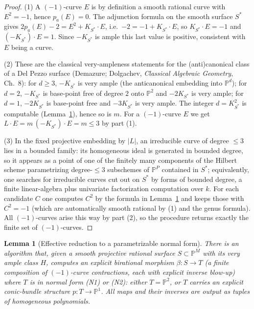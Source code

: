 \documentclass{amsart}
\theoremstyle{plain}
\newtheorem{lemma}{Lemma}
\theoremstyle{definition}
\newcommand{\PP}{\mathbb{P}}
\begin{document}
\begin{proof}
(1) A $(-1)$-curve $E$ is by definition a smooth rational curve with $E^2=-1$,
hence $p_a(E)=0$.  The adjunction formula on the smooth surface $S^\ast$ gives
$2p_a(E)-2=E^2+K_{S^\ast}\cdot E$, i.e.\ $-2=-1+K_{S^\ast}\cdot E$, so
$K_{S^\ast}\cdot E=-1$ and $(-K_{S^\ast})\cdot E=1$.  Since $-K_{S^\ast}$ is
ample this last value is positive, consistent with $E$ being a curve.

(2) These are the classical very-ampleness statements for the (anti)canonical
class of a Del Pezzo surface (Demazure; Dolgachev, \emph{Classical Algebraic
Geometry}, Ch.~8): for $d\ge3$, $-K_{S^\ast}$ is very ample (the anticanonical
embedding into $\PP^d$); for $d=2$, $-K_{S^\ast}$ is base-point free of degree
$2$ onto $\PP^2$ and $-2K_{S^\ast}$ is very ample; for $d=1$, $-2K_{S^\ast}$ is
base-point free and $-3K_{S^\ast}$ is very ample.  The integer $d=K_{S^\ast}^2$ is
computable (Lemma~\ref{lem:mmp}), hence so is $m$.  For a $(-1)$-curve $E$ we get
$L\cdot E=m\,(-K_{S^\ast})\cdot E=m\le3$ by part (1).

(3) In the fixed projective embedding by $|L|$, an irreducible curve of degree
$\le3$ lies in a bounded family: its homogeneous ideal is generated in bounded
degree, so it appears as a point of one of the finitely many components of the
Hilbert scheme parametrizing degree-$\le3$ subschemes of $\PP^P$ contained in
$S^\ast$; equivalently, one searches for irreducible curves cut out on $S^\ast$
by forms of bounded degree, a finite linear-algebra plus univariate
factorization computation over $k$.  For each candidate $C$ one computes $C^2$ by
the formula in Lemma~\ref{lem:mmp} and keeps those with $C^2=-1$ (which are
automatically smooth rational by (1) and the genus formula).  All $(-1)$-curves
arise this way by part (2), so the procedure returns exactly the finite set of
$(-1)$-curves.
\end{proof}

\begin{lemma}[Effective reduction to a parametrizable normal form]\label{lem:mmp}
There is an algorithm that, given a smooth projective rational surface
$S\subset\PP^M$ with its very ample class $H$, computes an explicit birational
morphism $\beta\colon S\to T$ \textup{(}a finite composition of $(-1)$-curve
contractions, each with explicit inverse blow-up\textup{)} where $T$ is in
normal form \textup{(N1)} or \textup{(N2)}: either $T=\PP^2$, or $T$ carries an
explicit conic-bundle structure $p\colon T\to\PP^1$.  All maps and their inverses
are output as tuples of homogeneous polynomials.
\end{lemma}
\end{document}
